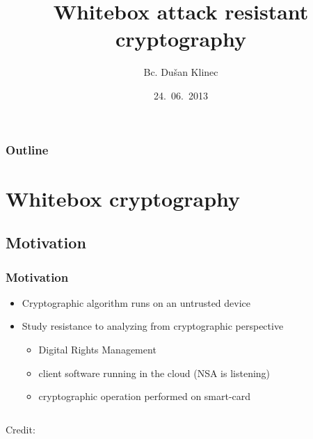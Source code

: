 \documentclass{beamer}
\title[Whitebox cryptography]{Whitebox attack resistant cryptography}
\author{Bc. Du\v{s}an Klinec}
\institute[FI MU]{Faculty of Informatics\\
		    Masaryk University\\
		    Brno}
\date{24.~06.~2013}
\begin{document}
\begin{frame}
  \titlepage
\end{frame}

\begin{frame}
  \frametitle{Outline}
  \tableofcontents
\end{frame}

\section{Whitebox cryptography}

\subsection{Motivation}
\begin{frame}
    \frametitle{Motivation}
    \begin{itemize}
     \item Cryptographic algorithm runs on an untrusted device
     \item Study resistance to analyzing from cryptographic perspective
     \begin{itemize}
      \item Digital Rights Management
      \item client software running in the cloud (NSA is listening)
      \item cryptographic operation performed on smart-card
     \end{itemize}
    \end{itemize}
    
    

    \begin{columns}
     \begin{column}{0.50\textwidth}
	\centerline{}
	\hspace*{15pt}\hbox{\tiny Credit:}
      \end{column}


\end{columns}
\end{frame}
\end{document}
